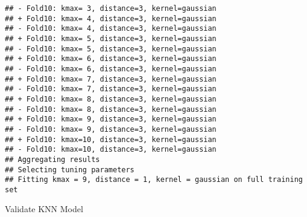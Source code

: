\documentclass[
]{article}
\newenvironment{Shaded}{\begin{snugshade}}{\end{snugshade}}
\newcommand{\AttributeTok}[1]{\textcolor[rgb]{0.77,0.63,0.00}{#1}}
\newcommand{\CommentTok}[1]{\textcolor[rgb]{0.56,0.35,0.01}{\textit{#1}}}
\newcommand{\FunctionTok}[1]{\textcolor[rgb]{0.00,0.00,0.00}{#1}}
\newcommand{\NormalTok}[1]{#1}
\newcommand{\OtherTok}[1]{\textcolor[rgb]{0.56,0.35,0.01}{#1}}
\newcommand{\SpecialCharTok}[1]{\textcolor[rgb]{0.00,0.00,0.00}{#1}}
\newcommand{\StringTok}[1]{\textcolor[rgb]{0.31,0.60,0.02}{#1}}
\begin{document}
\begin{verbatim}
## - Fold10: kmax= 3, distance=3, kernel=gaussian 
## + Fold10: kmax= 4, distance=3, kernel=gaussian 
## - Fold10: kmax= 4, distance=3, kernel=gaussian 
## + Fold10: kmax= 5, distance=3, kernel=gaussian 
## - Fold10: kmax= 5, distance=3, kernel=gaussian 
## + Fold10: kmax= 6, distance=3, kernel=gaussian 
## - Fold10: kmax= 6, distance=3, kernel=gaussian 
## + Fold10: kmax= 7, distance=3, kernel=gaussian 
## - Fold10: kmax= 7, distance=3, kernel=gaussian 
## + Fold10: kmax= 8, distance=3, kernel=gaussian 
## - Fold10: kmax= 8, distance=3, kernel=gaussian 
## + Fold10: kmax= 9, distance=3, kernel=gaussian 
## - Fold10: kmax= 9, distance=3, kernel=gaussian 
## + Fold10: kmax=10, distance=3, kernel=gaussian 
## - Fold10: kmax=10, distance=3, kernel=gaussian 
## Aggregating results
## Selecting tuning parameters
## Fitting kmax = 9, distance = 1, kernel = gaussian on full training set
\end{verbatim}

\begin{Shaded}
\end{Shaded}

\begin{Shaded}
\end{Shaded}

Validate KNN Model

\begin{Shaded}
\end{Shaded}
\end{document}
